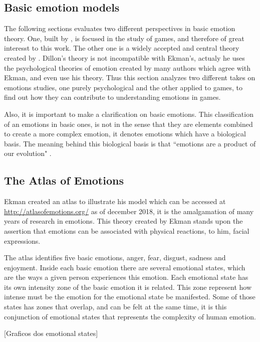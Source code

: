 \subsection{Basic emotion models}

The following sections evaluates two different perspectives in basic emotion theory. One, built by \cite{dillon_way_2010}, is focused in the study of games, and therefore of great interesst to this work. The other one is a widely accepted and central theory created by \cite{ekman_are_basic_emotions_nodate}. Dillon's theory is not incompatible with Ekman's, actualy he uses the psychological theories of emotion created by many authors which agree with Ekman, and even use his theory. Thus this section analyzes two different takes on emotions studies, one purely psychological and the other applied to games, to find out how they can contribute to understanding emotions in games.

Also, it is important to make a clarification on basic emotions. This classification of an emotions in basic ones, is not in the sense that they are elements combined to create a more complex emotion, it denotes emotions which have a biological basis. The meaning behind this biological basis is that ``emotions are a product of our evolution" \cite{ekman_are_basic_emotions_nodate}. 

\subsection{The Atlas of Emotions}

Ekman created an atlas to illustrate his model which can be accessed at \url{http://atlasofemotions.org/} as of december 2018, it is the amalgamation of many years of research in emotions. This theory created by Ekman stands upon the assertion that emotions can be associated with physical reactions, to him, facial expressions.

The atlas identifies five basic emotions, anger, fear, disgust, sadness and enjoyment. Inside each basic emotion there are several emotional states, which are the ways a given person experiences this emotion. Each emotional state has its own intensity zone of the basic emotion it is related. This zone represent how intense must be the emotion for the emotional state be manifested. Some of those states has zones that overlap, and can be felt at the same time, it is this conjunction of emotional states that represents the complexity of human emotion.

[Graficos dos emotional states]

